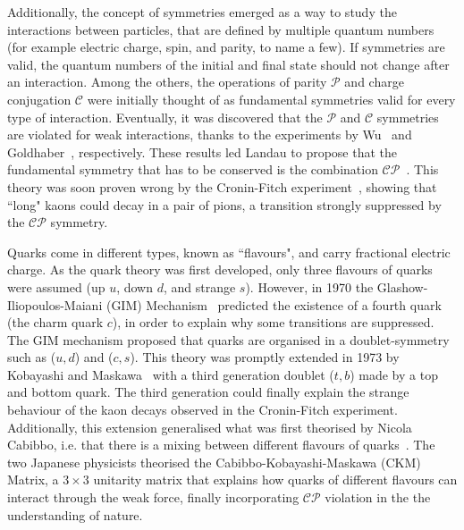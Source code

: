 Additionally, the concept of symmetries emerged as a way to study the interactions between particles, that are defined by multiple quantum numbers (for example electric charge, spin, and parity, to name a few). If symmetries are valid, the quantum numbers of the initial and final state should not change after an interaction.  Among the others, the operations of parity $\mathcal{P}$ and charge conjugation $\mathcal{C}$ were initially thought of as fundamental symmetries valid for every type of interaction.
Eventually, it was discovered that the $\mathcal{P}$ and $\mathcal{C}$ symmetries are violated  for weak interactions, thanks to the experiments by Wu~\cite{PhysRev.105.1413} and Goldhaber~\cite{PhysRev.109.1015}, respectively. These results led Landau to propose that the fundamental symmetry that has to be conserved is the combination $\mathcal{CP}$~\cite{LANDAU1957127}. This theory was soon proven wrong by the Cronin-Fitch experiment~\cite{Christenson:1964fg}, showing that ``long" kaons could decay in a pair of pions, a transition strongly suppressed by the $\mathcal{CP}$ symmetry.


Quarks come in different types, known as ``flavours", and carry fractional electric charge. As the quark theory was first developed, only three flavours of quarks were assumed (up $u$, down $d$, and strange $s$). 
However, in 1970 the Glashow-Iliopoulos-Maiani (GIM) Mechanism~\cite{Glashow:1970gm} predicted the existence of a fourth quark (the charm quark $c$), in order to explain why some transitions are suppressed. The GIM mechanism proposed that quarks are organised in a doublet-symmetry such as ($u,d$) and ($c,s$). This theory was promptly extended in 1973 by Kobayashi and Maskawa~\cite{Kobayashi:1973fv} with a third generation doublet ($t,b$) made by a top and bottom quark. The third generation could finally explain the strange behaviour of the kaon decays observed in the Cronin-Fitch experiment. Additionally, this extension generalised what was first theorised by Nicola Cabibbo, i.e. that there is a mixing between different flavours of quarks~\cite{Cabibbo:1963yz}. The two Japanese physicists theorised the Cabibbo-Kobayashi-Maskawa (CKM) Matrix, a $3\times3$ unitarity matrix that explains how quarks of different flavours can interact through the weak force, finally incorporating $\mathcal{CP}$ violation in the the understanding of nature.

